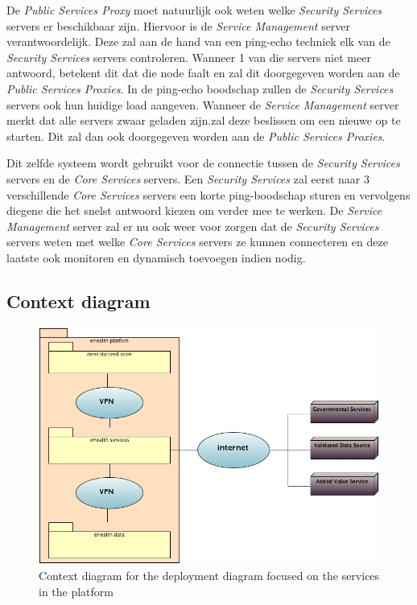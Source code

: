 \documentclass[a4paper,10pt]{article}
\begin{document}
De \textit{Public Services Proxy} moet natuurlijk ook weten welke \textit{Security Services} servers er beschikbaar zijn. Hiervoor is de \textit{Service Management} server verantwoordelijk. Deze zal aan de hand van een ping-echo techniek elk van de \textit{Security Services} servers controleren. Wanneer 1 van die servers niet meer antwoord, betekent dit dat die node faalt en zal dit doorgegeven worden aan de \textit{Public Services Proxies}. In de ping-echo boodschap zullen de \textit{Security Services} servers ook hun huidige load aangeven. Wanneer de \textit{Service Management} server merkt dat alle servers zwaar geladen zijn.zal deze beslissen om een nieuwe op te starten. Dit zal dan ook doorgegeven worden aan de \textit{Public Services Proxies}.

Dit zelfde systeem wordt gebruikt voor de connectie tussen de \textit{Security Services} servers en de \textit{Core Services} servers. Een \textit{Security Services} zal eerst naar 3 verschillende \textit{Core Services} servers een korte ping-boodschap sturen en vervolgens diegene die het snelst antwoord kiezen om verder mee te werken. De \textit{Service Management} server zal er nu ook weer voor zorgen dat de \textit{Security Services} servers weten met welke \textit{Core Services} servers ze kunnen connecteren en deze laatste ook monitoren en dynamisch toevoegen indien nodig.

\subsection{Context diagram}
\begin{center}
    \begin{figure}[!h]
      \includegraphics[scale=0.50, width=\textwidth]{../images/deployment_services_context.jpg}
	\caption{Context diagram for the deployment diagram focused on the services in the platform}
    \end{figure}
  \end{center}
\end{document}
